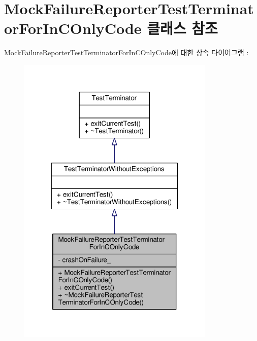 \hypertarget{class_mock_failure_reporter_test_terminator_for_in_c_only_code}{}\section{Mock\+Failure\+Reporter\+Test\+Terminator\+For\+In\+C\+Only\+Code 클래스 참조}
\label{class_mock_failure_reporter_test_terminator_for_in_c_only_code}


Mock\+Failure\+Reporter\+Test\+Terminator\+For\+In\+C\+Only\+Code에 대한 상속 다이어그램 \+: 
\nopagebreak
\begin{figure}[H]
\begin{center}
\leavevmode
\includegraphics[width=266pt]{class_mock_failure_reporter_test_terminator_for_in_c_only_code__inherit__graph}
\end{center}
\end{figure}



